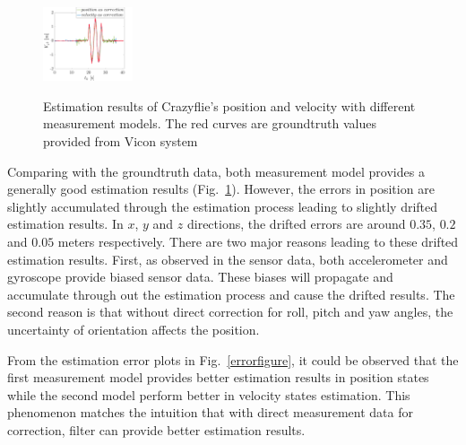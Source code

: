 \documentclass[letterpaper, 10 pt, conference]{ieeeconf}  %
\begin{document}
\begin{figure}[ht]
{	\includegraphics[width=0.235\textwidth]{curve/Tracking_vy.png}}
	\centering
	\caption{Estimation results of Crazyflie's position and velocity with different measurement models. The red curves are groundtruth values provided from Vicon system}
	\label{trackingfigure}
\end{figure}

Comparing with the groundtruth data, both measurement model provides a generally good estimation results (Fig.~\ref{trackingfigure}). However, the errors in position are slightly accumulated through the estimation process leading to slightly drifted estimation results. In $x$, $y$ and $z$ directions, the drifted errors are around $0.35$, $0.2$ and $0.05$ meters respectively. There are two major reasons leading to these drifted estimation results. First, as observed in the sensor data, both accelerometer and gyroscope provide biased sensor data. These biases will propagate and accumulate through out the estimation process and cause the drifted results. The second reason is that without direct correction for roll, pitch and yaw angles, the uncertainty of orientation affects the position.
 
From the estimation error plots in Fig.~\ref{errorfigure}, it could be observed that the first measurement model provides better estimation results in position states while the second model perform better in velocity states estimation. This phenomenon matches the intuition that with direct measurement data for correction, filter can provide better estimation results.
\end{document}
